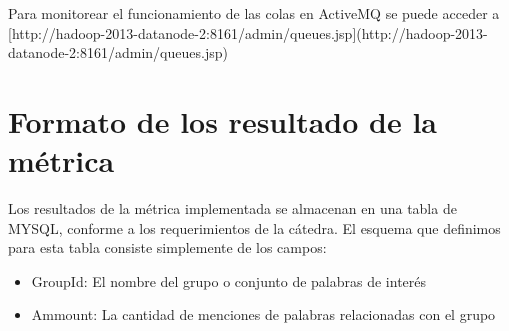 \documentclass[a4paper,10pt]{article}
\begin{document}
Para monitorear el funcionamiento de las colas en ActiveMQ se puede acceder a
[http://hadoop-2013-datanode-2:8161/admin/queues.jsp](http://hadoop-2013-datanode-2:8161/admin/queues.jsp)

\small
\section{Formato de los resultado de la métrica}

Los resultados de la métrica implementada se almacenan en una tabla de MYSQL, conforme a los requerimientos de la cátedra. El esquema que definimos para esta tabla consiste
simplemente de los campos:

\begin{itemize}
    \item GroupId: El nombre del grupo o conjunto de palabras de interés
    \item Ammount: La cantidad de menciones de palabras relacionadas con el grupo
\end{itemize}
\end{document}
